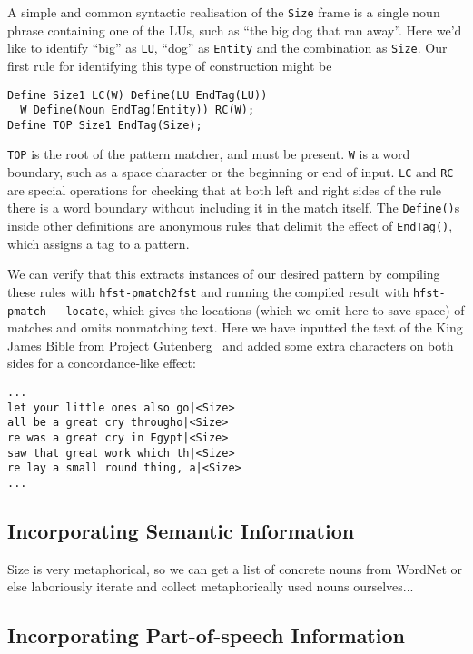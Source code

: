 \documentclass[11pt]{article}
\begin{document}
A simple and common syntactic realisation of the \verb+Size+ frame is a single
noun phrase containing one of the LUs, such as
``the big dog that ran away''. Here we'd like to identify ``big'' as \verb+LU+,
``dog'' as \verb+Entity+ and the combination as \verb+Size+.
Our first rule for identifying this type of construction might be

\begin{verbatim}
Define Size1 LC(W) Define(LU EndTag(LU))
  W Define(Noun EndTag(Entity)) RC(W);
Define TOP Size1 EndTag(Size);  
\end{verbatim}

\verb+TOP+ is the root of the pattern matcher, and must be present.
\verb+W+ is a word boundary, such as a space character or the beginning or end of
input. \verb+LC+ and \verb+RC+ are special operations for checking that at both left and right
sides of the rule there is a word boundary without including it in the match itself.
The \verb+Define()+s inside other definitions are anonymous rules that delimit the effect of
\verb+EndTag()+, which assigns a tag to a pattern.

We can verify that this extracts instances of our desired pattern by compiling
these rules with \verb+hfst-pmatch2fst+ and running the compiled result with
\verb+hfst-pmatch --locate+, which gives the locations (which we omit here to save space) of matches and omits
nonmatching text. Here we have inputted the text of the King James Bible from
Project Gutenberg~ and added some extra characters on both sides for
a concordance-like effect:

\begin{verbatim}
...
let your little ones also go|<Size>
all be a great cry througho|<Size>
re was a great cry in Egypt|<Size>
saw that great work which th|<Size>
re lay a small round thing, a|<Size>
...
\end{verbatim}

\subsection{Incorporating Semantic Information}
Size is very metaphorical, so we can get a list of concrete nouns from WordNet
or else laboriously iterate and collect metaphorically used nouns ourselves...

\subsection{Incorporating Part-of-speech Information}
\end{document}
